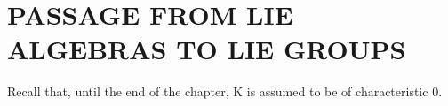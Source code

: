 \section{PASSAGE FROM LIE ALGEBRAS TO LIE GROUPS}

Recall that, until the end of the chapter, K is assumed to be of characteristic 0.

